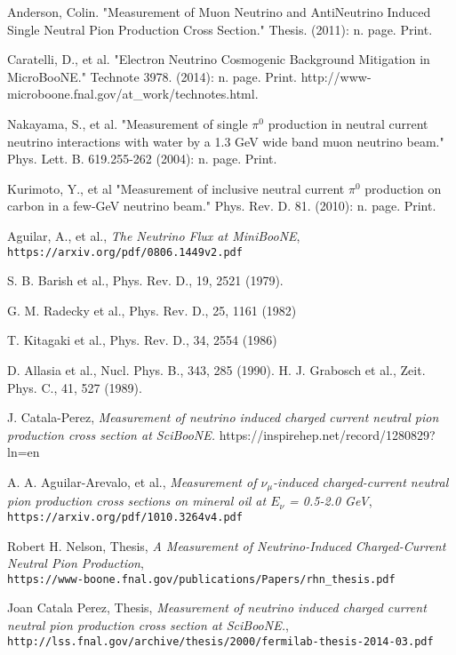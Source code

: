 \documentclass[12pt]{article}
\begin{document}
\begin{thebibliography}{20}
Anderson, Colin. "Measurement of Muon Neutrino and AntiNeutrino Induced Single Neutral Pion Production Cross Section." Thesis. (2011): n. page. Print.

Caratelli, D., et al. "Electron Neutrino Cosmogenic Background Mitigation in MicroBooNE." Technote 3978. (2014): n. page. Print. http://www-microboone.fnal.gov/at\_work/technotes.html.

Nakayama, S., et al. "Measurement of single $\pi^0$ production in neutral current neutrino interactions with water by a 1.3 GeV wide band muon neutrino beam." Phys. Lett. B. 619.255-262 (2004): n. page. Print.

Kurimoto, Y., et al "Measurement of inclusive neutral current $\pi^0$ production on carbon in a few-GeV neutrino beam." Phys. Rev. D. 81. (2010): n. page. Print.

  Aguilar, A., et al., \emph{The Neutrino Flux at MiniBooNE},\\
    \texttt{https://arxiv.org/pdf/0806.1449v2.pdf}

  S. B. Barish et al., Phys. Rev. D., 19, 2521 (1979).

 G. M. Radecky et al., Phys. Rev. D., 25, 1161 (1982)
 
 T. Kitagaki et al., Phys. Rev. D., 34, 2554 (1986)
 
 D. Allasia et al., Nucl. Phys. B., 343, 285 (1990).
 H. J. Grabosch et al., Zeit. Phys. C., 41, 527 (1989).

J. Catala-Perez, \emph{Measurement of neutrino induced charged current neutral pion production cross section at SciBooNE.}
https://inspirehep.net/record/1280829?ln=en

  A. A. Aguilar-Arevalo, et al., \emph{Measurement of $\nu_\mu$-induced charged-current neutral pion production cross sections on mineral oil at $E_\nu$ = 0.5-2.0 GeV},\\
  \texttt{https://arxiv.org/pdf/1010.3264v4.pdf}

  Robert H. Nelson, Thesis, \emph{A Measurement of Neutrino-Induced Charged-Current Neutral Pion Production},\\
  \texttt{https://www-boone.fnal.gov/publications/Papers/rhn\_thesis.pdf}
  
  Joan Catala Perez, Thesis, \emph{Measurement of neutrino induced charged current neutral pion production cross section at SciBooNE.},\\
  \texttt{http://lss.fnal.gov/archive/thesis/2000/fermilab-thesis-2014-03.pdf}  


\end{thebibliography}
\end{document}
